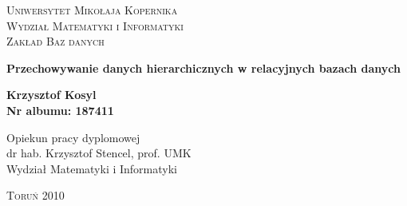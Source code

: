 

\begin{titlepage}
    \begin{center}
        \Large\scshape Uniwersytet Mikołaja Kopernika\\
        Wydział Matematyki i Informatyki\\
        Zakład Baz danych
    \end{center}
    \vspace{22ex}
    \begin{center}
        \Huge\bfseries
        Przechowywanie danych hierarchicznych w relacyjnych bazach danych
    \end{center}
    \vspace{22ex}
    \begin{center}
        \Large\bfseries
        Krzysztof Kosyl \\
        \vspace{0.5ex}
        \normalsize
        Nr albumu: 187411
    \end{center}
    \vspace{19ex}
    \hspace*{\fill}
    \parbox{0.50\textwidth}{\setlength{\parindent}{1em}
            \normalsize
            \noindent
            Opiekun pracy dyplomowej\\
            dr hab. Krzysztof Stencel, prof. UMK\\
            Wydział Matematyki i Informatyki}
    \vfill
    \centerline{\textsc{Toruń} 2010}
    \addtocounter{page}{-1}
\end{titlepage}



